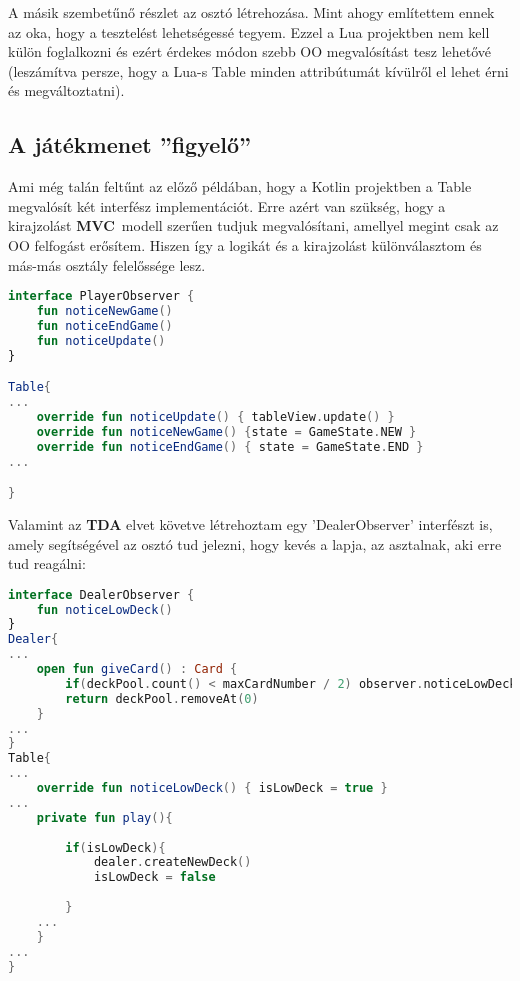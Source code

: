 A másik szembetűnő részlet az osztó létrehozása. Mint ahogy említettem ennek az oka, hogy a tesztelést lehetségessé tegyem. Ezzel a Lua projektben nem kell külön foglalkozni és ezért érdekes módon szebb OO megvalósítást tesz lehetővé (leszámítva persze, hogy a Lua-s Table minden attribútumát kívülről el lehet érni és megváltoztatni).

\subsection{A játékmenet ''figyelő''}
\label{subsec:p_observer}
Ami még talán feltűnt az előző példában, hogy a Kotlin projektben a Table megvalósít két interfész implementációt. Erre azért van szükség, hogy a kirajzolást \textbf{MVC}~modell szerűen tudjuk megvalósítani, amellyel megint csak az OO felfogást erősítem. Hiszen így a logikát és a kirajzolást különválasztom és más-más osztály felelőssége lesz.
\scriptsize
\begin{lstlisting}[language = Kotlin]
interface PlayerObserver {
	fun noticeNewGame()
	fun noticeEndGame()
	fun noticeUpdate()
}

Table{
...
    override fun noticeUpdate() { tableView.update() }
	override fun noticeNewGame() {state = GameState.NEW }
	override fun noticeEndGame() { state = GameState.END }
...

}
\end{lstlisting}
\normalsize
Valamint az \textbf{TDA} elvet követve létrehoztam egy 'DealerObserver' interfészt is, amely segítségével az osztó tud jelezni, hogy kevés a lapja, az asztalnak, aki erre tud reagálni:
\scriptsize
\begin{lstlisting}[language = Kotlin]
interface DealerObserver {
	fun noticeLowDeck()
}
Dealer{
...
	open fun giveCard() : Card {
		if(deckPool.count() < maxCardNumber / 2) observer.noticeLowDeck()
		return deckPool.removeAt(0)
	}
...
}
Table{
...
	override fun noticeLowDeck() { isLowDeck = true }
...
	private fun play(){
	
		if(isLowDeck){
			dealer.createNewDeck()
			isLowDeck = false
	
		}
	...
	}
...
}
\end{lstlisting}
\normalsize

\newpage


